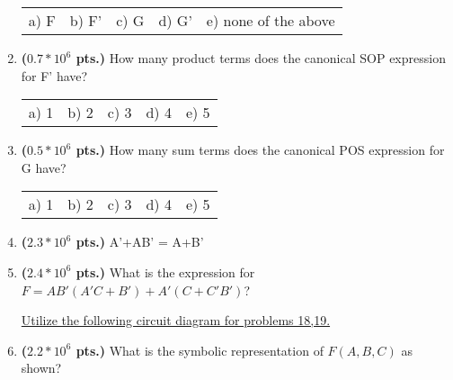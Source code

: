 \documentclass{article}
\begin{document}
\begin{enumerate}
\begin{tabular}{p{0.7in} p{0.7in} p{0.7in} p{0.7in} l}
a) F & b) F' & c) G & d) G' & e) none of the above
\end{tabular}


\item {\bf ($0.7*10^6$ pts.)} How many product terms does the canonical SOP expression 
for F' have?

\begin{tabular}{p{0.7in} p{0.7in} p{0.7in} p{0.7in} l}
a) 1 & b) 2 & c) 3 & d) 4 & e) 5
\end{tabular}

\item {\bf ($0.5*10^6$ pts.)} How many sum terms does the canonical POS expression for G have?

\begin{tabular}{p{0.7in} p{0.7in} p{0.7in} p{0.7in} l}
a) 1 & b) 2 & c) 3 & d) 4 & e) 5
\end{tabular}

\item {\bf ($2.3*10^6$ pts.)} A'+AB' = A+B'

\item {\bf ($2.4*10^6$ pts.)} What is the \SOPmin expression for  \\
$F=AB'(A'C + B') + A'(C+C'B') $?


\pagebreak
\underline{Utilize the following circuit diagram for problems 18,19.}

\begin{figure}[ht]
\end{figure}

\item {\bf ($2.2*10^6$ pts.)} What is the symbolic representation of $F(A,B,C)$ as shown?


\end{enumerate}
\end{document}

